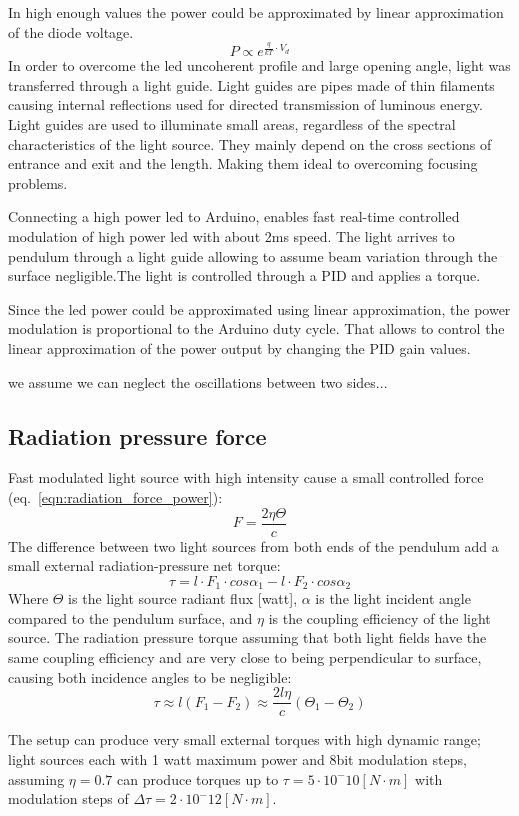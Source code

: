 \documentclass[\main/master.tex]{subfiles}
\begin{document}
In high enough values the power could be approximated by linear approximation of the diode voltage.
\begin{equation}
P\propto e^{\frac{q}{kT}\cdot V_d}\label{eqn:led power}
\end{equation}
In order to overcome the led uncoherent profile and large opening angle, light was transferred through a light guide. Light guides are pipes made of thin filaments causing internal reflections used for directed transmission of luminous energy. Light guides are used to illuminate small areas, regardless of the spectral characteristics of the light source. They mainly depend on the cross sections of entrance and exit and the length. Making them ideal to overcoming focusing problems.
\par\noindent
Connecting a high power led to Arduino, enables fast real-time controlled modulation of high power led with about 2ms speed. The light arrives to pendulum through a light guide allowing to assume beam variation through the surface negligible.The light is controlled through a PID and applies a torque.
\par\noindent
Since the led power could be approximated using linear approximation, the power modulation is proportional to the Arduino duty cycle. That allows to control the linear approximation of the power output by changing the PID gain values.  
\par\noindent
we assume we can neglect the oscillations between two sides...


\subsection{Radiation pressure force}
Fast modulated light source with high intensity cause a small controlled force (eq.~\ref{eqn:radiation_force_power}):
\begin{equation}
F = \frac{2\eta\Theta}{{c}} \label{eqn:radiation force_1}
\end{equation}
The difference between two light sources from both ends of the pendulum add a small external  radiation-pressure net torque:
\begin{equation}
\tau = l\cdot F_1 \cdot cos\alpha_1 - l\cdot F_2 \cdot cos\alpha_2  \label{eqn:radiation torque}
\end{equation}
Where $\Theta$ is the light source radiant flux [watt], $\alpha$ is the light incident angle compared to the pendulum surface, and $\eta$ is the coupling efficiency of the light source. The radiation pressure torque assuming that both light fields have the same coupling efficiency and are very close to being perpendicular to surface, causing both incidence angles to be negligible:  
\begin{equation}
\tau \approx l(F_1 - F_2) \approx \frac{2l\eta}{{c}} (\Theta_1 -\Theta_2) \label{eqn:radiation torque_final}
\end{equation}
\par\noindent
The setup can produce very small external torques with high dynamic range; light sources each with 1 watt maximum power and 8bit modulation steps, assuming $\eta = 0.7$ can produce torques up to $\tau = 5\cdot10^-{10} [N\cdot m]$ with modulation steps of $\Delta\tau = 2\cdot10^-{12} [N\cdot m]$. 
\end{document}
